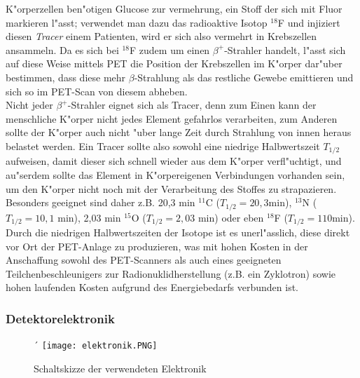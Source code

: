 \documentclass{article}
\begin{document}
K"orperzellen ben"otigen Glucose zur vermehrung, ein Stoff der sich mit Fluor markieren l"asst; verwendet man dazu das radioaktive Isotop $^{18}$F und injiziert diesen \textit{Tracer} einem Patienten, wird er sich also vermehrt in Krebszellen ansammeln. Da es sich bei $^{18}$F zudem um einen $\beta^+$-Strahler handelt, l"asst sich auf diese Weise mittels PET die Position der Krebszellen im K"orper dar"uber bestimmen, dass diese mehr $\beta$-Strahlung als das restliche Gewebe emittieren und sich so im PET-Scan von diesem abheben.\\
Nicht jeder $\beta^+$-Strahler eignet sich als Tracer, denn zum Einen kann der menschliche K"orper nicht jedes Element gefahrlos verarbeiten, zum Anderen sollte der K"orper auch nicht "uber lange Zeit durch Strahlung von innen heraus belastet werden. Ein Tracer sollte also sowohl eine niedrige Halbwertszeit $T_{1/2}$ aufweisen, damit dieser sich schnell wieder aus dem K"orper verfl"uchtigt, und au"serdem sollte das Element in K"orpereigenen Verbindungen vorhanden sein, um den K"orper nicht noch mit der Verarbeitung des Stoffes zu strapazieren. Besonders geeignet sind daher z.B. 20,3 min $^{11}$C ($T_{1/2}=20,3$min), $^{13}$N ($T_{1/2}=10,1$ min), 2,03 min $^{15}$O ($T_{1/2}=2,03$ min) oder eben $^{18}$F ($T_{1/2}=110$min). Durch die niedrigen Halbwertszeiten der Isotope ist es unerl"asslich, diese direkt vor Ort der PET-Anlage zu produzieren, was mit hohen Kosten in der Anschaffung sowohl des PET-Scanners als auch eines geeigneten Teilchenbeschleunigers zur Radionuklidherstellung (z.B. ein Zyklotron) sowie hohen laufenden Kosten aufgrund des Energiebedarfs verbunden ist.





\subsubsection{Detektorelektronik}


\begin{figure}[H]
	\centering
	´%
	\texttt{[image: elektronik.PNG]}
	\caption[Schaltskizze der verwendeten Elektronik]{Schaltskizze der verwendeten Elektronik\footnotemark}
	\label{figElektronik}
\end{figure}
\end{document}
